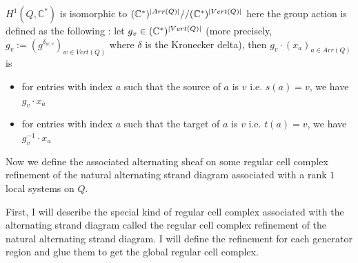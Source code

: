 $H^1(Q,\mathbb{C}^*)$ is isomorphic to $(\mathbb{C}^*)^{|Arr(Q)|}//(\mathbb{C}^*)^{|Vert(Q)|}$
here the group action is defined as the following : let $g_v \in (\mathbb{C}^*)^{|Vert(Q)|}$
(more precisely, $g_v := (g^{\delta_{w,v}})_{w \in Vert(Q)}$ where $\delta$ is the Kronecker delta),
then $g_v \cdot (x_a)_{a\in Arr(Q)}$ is 

\begin{itemize}
\item for entries with index $a$ such that the source of $a$ is $v$ i.e. $s(a) = v$, we have $g_v \cdot x_a$
\item for entries with index $a$ such that the target of $a$ is $v$ i.e. $t(a) = v$, we have $g_v^{-1} \cdot x_a$
\end{itemize}


Now we define the associated alternating sheaf on some regular cell complex refinement of the natural alternating strand diagram associated with a rank $1$ local systems on $Q$.

First, I will describe the special kind of regular cell complex associated with the alternating strand diagram called the regular cell complex refinement of the natural alternating strand diagram. I will define the refinement for each generator region and glue them to get the global regular cell complex.

